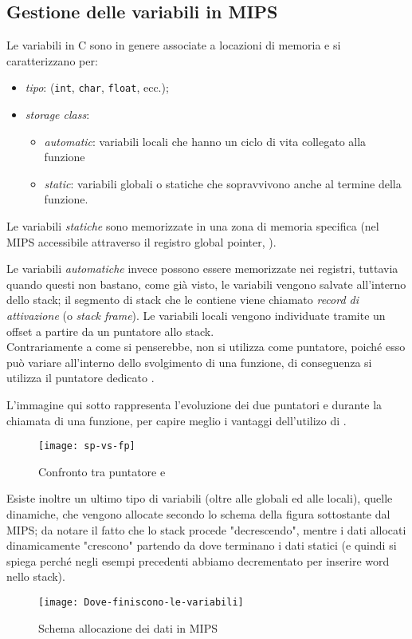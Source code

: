 \subsection{Gestione delle variabili in MIPS}
Le variabili in C sono in genere associate a locazioni di memoria e si caratterizzano per:
\begin{itemize}
	\item \emph{tipo}: (\texttt{int}, \texttt{char}, \texttt{float}, ecc.);
	\item \emph{storage class}:
	\begin{itemize}
		\item \emph{automatic}: variabili locali che hanno un ciclo di vita collegato alla funzione
		\item \emph{static}: variabili globali o statiche che sopravvivono anche al termine della funzione.
	\end{itemize}
\end{itemize}

Le variabili \emph{statiche} sono memorizzate in una zona di memoria specifica (nel MIPS accessibile attraverso il registro global pointer, ).

Le variabili \emph{automatiche} invece possono essere memorizzate nei registri, tuttavia quando questi non bastano, come già visto, le variabili vengono salvate all'interno dello stack; il segmento di stack che le contiene viene chiamato \emph{record di attivazione} (o \emph{stack frame}). Le variabili locali vengono individuate tramite un offset a partire da un puntatore allo stack.\\
Contrariamente a come si penserebbe, non si utilizza  come puntatore, poiché esso può variare all'interno dello svolgimento di una funzione, di conseguenza si utilizza il puntatore dedicato .

L'immagine qui sotto rappresenta l'evoluzione dei due puntatori  e  durante la chiamata di una funzione, per capire meglio i vantaggi dell'utilizo di .
\begin{figure}[H]
	\centering
	\texttt{[image: sp-vs-fp]}
	\caption{Confronto tra puntatore  e }
\end{figure}

Esiste inoltre un ultimo tipo di variabili (oltre alle globali ed alle locali), quelle dinamiche, che vengono allocate secondo lo schema della figura sottostante dal MIPS; da notare il fatto che lo stack procede "decrescendo", mentre i dati allocati dinamicamente "crescono"  partendo da dove terminano i dati statici (e quindi si spiega perché negli esempi precedenti abbiamo decrementato  per inserire word nello stack).
\begin{figure}[H]
	\centering
	\texttt{[image: Dove-finiscono-le-variabili]}
	\caption{Schema allocazione dei dati in MIPS}
\end{figure}

